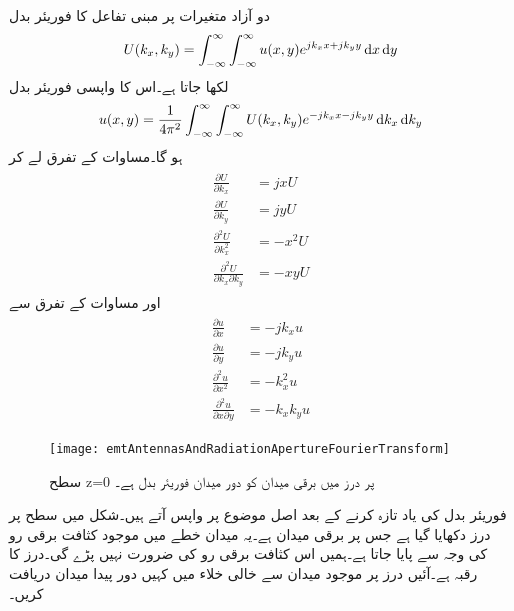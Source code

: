 دو آزاد متغیرات پر مبنی تفاعل  کا فوریئر بدل
\begin{align}\label{مساوات_اینٹینا_فوریئر_بدل_پ}
U(k_x,k_y)=\int_{-\infty}^{\infty} \int_{-\infty}^{\infty} u(x,y)e^{j k_x x+ j k_y y} \dif x \dif y
\end{align}
لکھا جاتا ہے۔اس کا واپسی فوریئر بدل
\begin{align}\label{مساوات_اینٹینا_فوریئر_بدل_ت}
u(x,y)=\frac{1}{4\pi^2}\int_{-\infty}^{\infty} \int_{-\infty}^{\infty} U(k_x,k_y)e^{-j k_x x- j k_y y} \dif k_x \dif k_y
\end{align}
ہو گا۔مساوات  کے تفرق لے کر 
\begin{gather}
\begin{aligned}\label{مساوات_اینٹینا_فوریئر_بدل_ٹ}
\frac{\partial U}{\partial k_x}&=j x U\\
\frac{\partial U}{\partial k_y}&=j y U\\
\frac{\partial^2 U}{\partial k_x^2}&= -x^2 U\\
\frac{\partial^2 U}{\partial k_x \partial k_y}&=-x y U
\end{aligned}
\end{gather}
اور مساوات  کے تفرق سے
\begin{gather}
\begin{aligned}\label{مساوات_اینٹینا_فوریئر_بدل_ث}
\frac{\partial u}{\partial x}&=-j k_x u\\
\frac{\partial u}{\partial y}&=-j k_y u\\
\frac{\partial^2 u}{\partial x^2}&= -k_x^2 u\\
\frac{\partial^2 u}{\partial x \partial y}&=-k_x k_y u
\end{aligned}
\end{gather}

\begin{figure}
\centering
\texttt{[image: emtAntennasAndRadiationApertureFourierTransform]}
\caption{سطح z=0 پر درز میں برقی میدان  کو دور میدان فوریئر بدل ہے۔}
\label{شکل_اینٹینا_درز_فوریئر_بدل}
\end{figure}
فوریئر بدل کی یاد تازہ کرنے کے بعد اصل موضوع پر واپس آتے ہیں۔شکل  میں  سطح پر درز دکھایا گیا ہے جس پر برقی میدان
  ہے۔یہ میدان  خطے میں موجود کثافت برقی رو کی وجہ سے پایا جاتا ہے۔ہمیں اس کثافت برقی رو کی ضرورت نہیں پڑے گی۔درز کا رقبہ  ہے۔آئیں درز پر موجود میدان سے خالی خلاء میں کہیں دور پیدا میدان دریافت کریں۔ 

